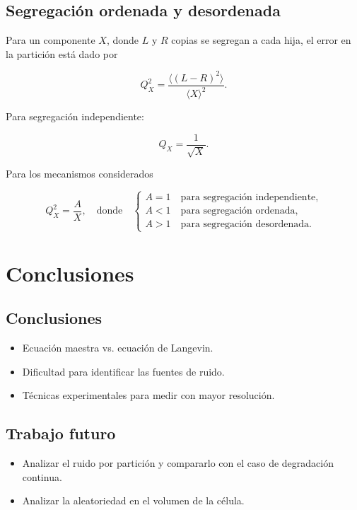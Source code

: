 \documentclass[xcolor=dvipsnames]{beamer}
\begin{document}
\subsection{Segregaci\'on ordenada y desordenada}
\begin{frame}

Para un componente $X$, donde $L$ y $R$ copias se segregan a cada hija, el error en la partici\'on est\'a dado por

$$Q_X^2 = \frac{\langle (L-R)^2 \rangle}{\langle X \rangle^2}. $$

Para segregaci\'on independiente:

$$Q_X = \frac{1}{\sqrt{X}}.$$

Para los mecanismos considerados

$$ Q_X^2 = \frac{A}{X}, \quad \text{donde} \quad 
\begin{cases}
A = 1 \quad \text{para segregaci\'on independiente,}\\
A < 1 \quad \text{para segregaci\'on ordenada,}\\
A > 1 \quad \text{para segregaci\'on desordenada.}
\end{cases} 
$$

\end{frame}

\section{Conclusiones}
\subsection{Conclusiones}
\begin{frame}
\begin{itemize}
\item Ecuaci\'on maestra vs. ecuaci\'on de Langevin.
\item Dificultad para identificar las fuentes de ruido.
\item T\'ecnicas experimentales para medir con mayor resoluci\'on.
\end{itemize}
\end{frame}
\subsection{Trabajo futuro}
\begin{frame}
\begin{itemize}

\item Analizar el ruido por partici\'on y compararlo con el caso de degradaci\'on continua.
\item Analizar la aleatoriedad en el volumen de la c\'elula.

\end{itemize}
\end{frame}

\begin{frame}[allowframebreaks]
\printbibliography
\end{frame}
\end{document}

